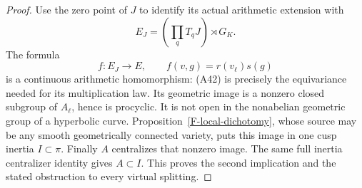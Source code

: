 \begin{proof}
Use the zero point of $J$ to identify its actual
arithmetic extension with
\[
 E_J=\left(\prod_qT_qJ\right)\rtimes G_K.
\]
The formula
\[
 f:E_J\longrightarrow E,
       \qquad f(v,g)=r(v_\ell)s(g)                       \tag{A43}
\]
is a continuous arithmetic homomorphism: (A42)
is precisely the equivariance needed for its
multiplication law. Its geometric image is a
nonzero closed subgroup of $A_\ell$, hence is
procyclic. It is not open in the nonabelian
geometric group of a hyperbolic curve.
Proposition~\ref{F-local-dichotomy}, whose source
may be any smooth geometrically connected
variety, puts this image in one cusp inertia
$I\subset\pi$. Finally $A$ centralizes that
nonzero image. The same full inertia centralizer
identity gives $A\subset I$.
This proves the second implication and the
stated obstruction to every virtual splitting.
\end{proof}

